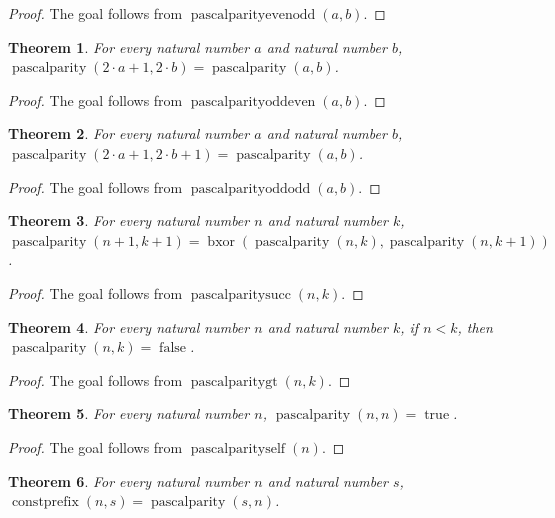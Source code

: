 \documentclass[11pt]{article}
\newtheorem{theorem}{Theorem}[section]
\theoremstyle{definition}
\begin{document}
\begin{proof}
The goal follows from \(\operatorname{pascalparityevenodd}(a, b)\).
\end{proof}
\begin{theorem}
\label{ll:observations:pascal-parity-odd-even}
For every natural number \(a\) and natural number \(b\), \(\operatorname{pascalparity}(2 \cdot a + 1, 2 \cdot b) = \operatorname{pascalparity}(a, b)\).
\end{theorem}
\begin{proof}
The goal follows from \(\operatorname{pascalparityoddeven}(a, b)\).
\end{proof}
\begin{theorem}
\label{ll:observations:pascal-parity-odd-odd}
For every natural number \(a\) and natural number \(b\), \(\operatorname{pascalparity}(2 \cdot a + 1, 2 \cdot b + 1) = \operatorname{pascalparity}(a, b)\).
\end{theorem}
\begin{proof}
The goal follows from \(\operatorname{pascalparityoddodd}(a, b)\).
\end{proof}
\begin{theorem}
\label{ll:observations:pascal-parity-succ}
For every natural number \(n\) and natural number \(k\), \(\operatorname{pascalparity}(n + 1, k + 1) = \operatorname{bxor}(\operatorname{pascalparity}(n, k), \operatorname{pascalparity}(n, k + 1))\).
\end{theorem}
\begin{proof}
The goal follows from \(\operatorname{pascalparitysucc}(n, k)\).
\end{proof}
\begin{theorem}
\label{ll:observations:pascal-parity-gt}
For every natural number \(n\) and natural number \(k\), if \(n < k\), then \(\operatorname{pascalparity}(n, k) = \operatorname{false}\).
\end{theorem}
\begin{proof}
The goal follows from \(\operatorname{pascalparitygt}(n, k)\).
\end{proof}
\begin{theorem}
\label{ll:observations:pascal-parity-self}
For every natural number \(n\), \(\operatorname{pascalparity}(n, n) = \operatorname{true}\).
\end{theorem}
\begin{proof}
The goal follows from \(\operatorname{pascalparityself}(n)\).
\end{proof}
\begin{theorem}
\label{ll:observations:const-prefix-eq-lucas}
For every natural number \(n\) and natural number \(s\), \(\operatorname{constprefix}(n, s) = \operatorname{pascalparity}(s, n)\).
\end{theorem}
\end{document}
